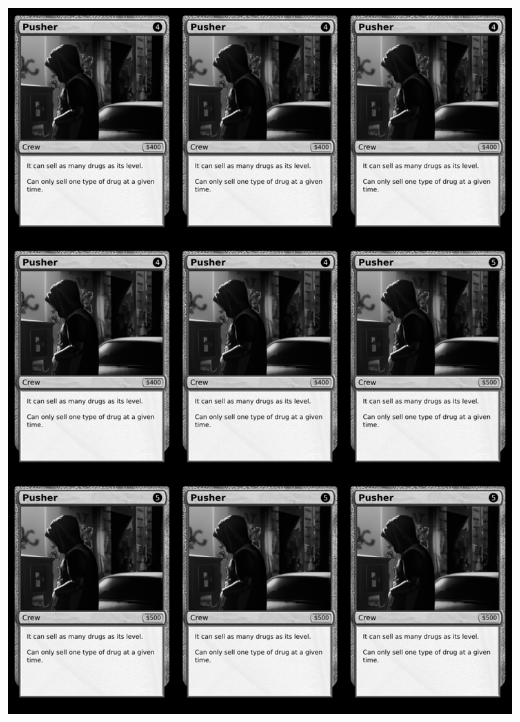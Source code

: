 \documentclass[a4paper]{article}
\begin{document}
\begin{center}
	\centering
	\includegraphics[width=190.5mm,height=266.7mm]{output/temp/page11.png}
\end{center}

\newpage
\end{document}
